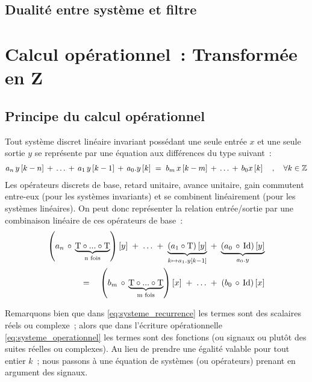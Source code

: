\subsection{Dualité entre système et filtre}



\section{Calcul opérationnel~: Transformée en Z}


\subsection{Principe du calcul opérationnel}
\label{sec:calcul_operationnel}
Tout système discret linéaire invariant possédant une seule entrée $x$ et
une seule sortie $y$ se représente par une équation aux différences du
type suivant~:
\begin{eqnarray}
  \label{eq:systeme_recurrence}
  a_n\,y\left[k-n\right] \,+\, \ldots  \,+\,  a_1\,y\left[k-1\right] \,+\, a_0.y\left[k\right] \;=\; b_m\,x\left[k-m\right] \,+\, \ldots \,+\, b_0 x\left[k\right] \quad,\quad \forall k\in\mathbb{Z}
\end{eqnarray}
Les opérateurs discrets de base, retard unitaire, avance unitaire,
gain commutent entre-eux (pour les systèmes invariants) et se combinent
linéairement (pour les systèmes linéaires). On peut donc représenter la
relation entrée/sortie par une combinaison linéaire de ces opérateurs
de base~:
\begin{eqnarray}
  \label{eq:systeme_operationnel}
  \left(a_n\,\circ\,\underbrace{\mathrm{T}\circ...\circ \mathrm{T}}_{\text{n fois}}\right)\left[y\right]\; +\; \ldots \;+\; \underbrace{\left(a_1\circ\mathrm{T}\right)\left[y\right]}_{k\mapsto a_1.y\left[k-1\right]} \;+\; \underbrace{\left(a_0 \,\circ\, \mathrm{Id}\right)\left[y\right]}_{a_0.y} \\
  =\quad \left(b_m\,\circ\,\underbrace{\mathrm{T}\circ...\circ \mathrm{T}}_{\text{m fois}}\right)\left[x\right] \;+\; \ldots \;+\; \left(b_0 \,\circ\,\mathrm{Id}\right)\left[x\right]
\end{eqnarray}

\begin{remarque}
  Remarquons bien que dans \eqref{eq:systeme_recurrence} les termes
  sont des scalaires réels ou complexe~; alors que dans l'écriture
  opérationnelle \eqref{eq:systeme_operationnel} les termes sont des
  fonctions (ou signaux ou plutôt des suites réelles ou complexes). Au
  lieu de prendre une égalité valable pour tout entier $k$~; nous
  passons à une équation de systèmes (ou opérateurs) prenant en
  argument des signaux.
\end{remarque}


